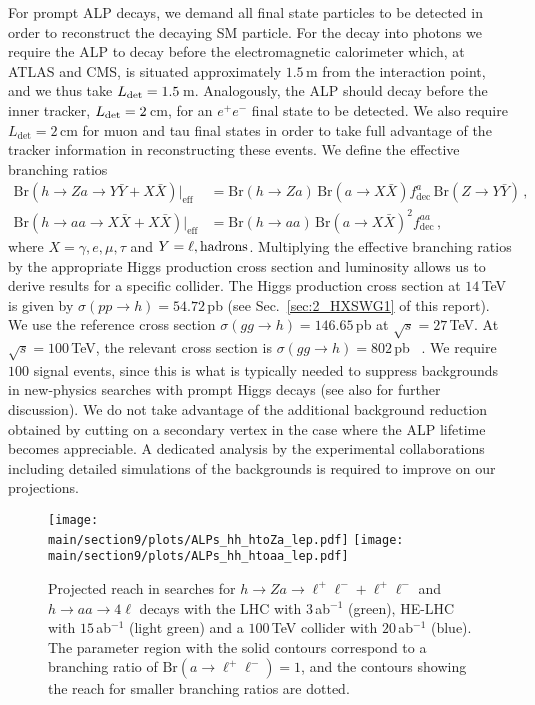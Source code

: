 For prompt ALP decays, we demand all final state particles to be detected in order to reconstruct the decaying SM particle. For the decay into photons we 
require the ALP to decay before the electromagnetic calorimeter which, at ATLAS and CMS, is situated approximately $1.5\,$m from the interaction point, and we thus take $L_{\rm det} = 
1.5\,$m. Analogously, the ALP should decay before the inner tracker, $L_{\rm det} = 2\,$cm, for an $e^+e^-$ final state to be detected. We also require $L_\text{det}
=2\,$cm for muon and tau final states in order to take full advantage of the tracker information in reconstructing these events. We define the effective branching ratios
%
\begin{align}
\text{Br}(h\to Za\to Y\bar{Y}+X\bar{X})\big\vert_\text{eff}&=\text{Br}(h\to Za)\,\text{Br}(a\to X\bar{X})f_\text{dec}^a\,\text{Br}(Z\to Y\bar{Y})\,,\label{eq:LHChZa}\\
\text{Br}(h\to aa\to X\bar{X}+X\bar{X})\big\vert_\text{eff}&=\text{Br}(h\to aa)\,\text{Br}(a\to X\bar{X})^2f_\text{dec}^{aa}\,,\label{eq:LHChaa}
\end{align}
%
where $X=\gamma, e, \mu, \tau$ and $Y=\ell, {\rm hadrons}$. Multiplying the effective branching ratios by the appropriate Higgs production cross section and luminosity allows us to derive results for a specific collider. The Higgs production cross section at $14\,$TeV is given by $\sigma(pp\to h)= 54.72\,$pb (see Sec.~\ref{sec:2_HXSWG1} of this report). We use the reference cross section $\sigma(gg 
\to h) = 146.65\,$pb at $\sqrt{s} = 27\,$TeV. At $\sqrt{s} = 100\,$TeV, the relevant cross section is $\sigma(gg \to h) = 802\,$pb ~\cite{Mangano:2016jyj}. We require $100$ signal events, since this is what is typically needed to suppress backgrounds in new-physics searches with prompt Higgs decays \cite{Khachatryan:2016vau, Chatrchyan:2013vaa,Aad:2015bua} (see also \cite{Bauer:2017ris} for 
further discussion).
We do not take advantage of the additional background reduction obtained by cutting on a secondary vertex in the case where the ALP lifetime becomes appreciable. A dedicated analysis by the experimental collaborations including detailed simulations of the backgrounds is required to improve on our projections.  


%
\begin{figure}[t]
\begin{center}
\texttt{[image: \\main/section9/plots/ALPs\_hh\_htoZa\_lep.pdf]}
\texttt{[image: \\main/section9/plots/ALPs\_hh\_htoaa\_lep.pdf]}
\end{center}
\vspace{-3mm}
\caption{\label{fig:pphZalep} Projected reach in searches for $h \to Za \to \ell^+\ell^-+\ell^+\ell^- $ and $h \to aa \to 4\ell $ decays with the LHC with $3$\,ab$^{-1}$
(green), HE-LHC with $15$\,ab$^{-1}$ (light green) and a $100\,$TeV collider with $20$\,ab$^{-1}$ (blue). The parameter region with the solid contours correspond to a branching ratio of $\text{Br}(a\to 
\ell^+\ell^-)=1$, and the contours showing the reach for smaller branching ratios are dotted.}
\end{figure}
%

